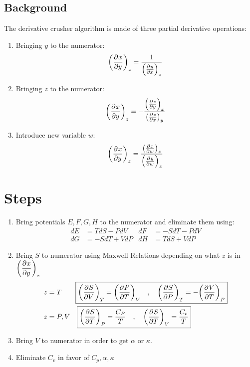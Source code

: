 \documentclass{article}
\begin{document}
    \subsection{Background}
    The derivative crusher algorithm is made of three partial derivative operations:
    \begin{enumerate}
        \item Bringing $y$ to the numerator:
        \begin{equation*}
            \pder{x}{y}[z]=\oo{\pder{y}{x}[z]}
        \end{equation*}
        \item Bringing $z$ to the numerator:
        \begin{equation*}
            \pder{x}{y}[z]=-\frac{\pder{z}{y}[x]}{\pder{z}{x}[y]}
        \end{equation*}
        \item Introduce new variable $w$:
        \begin{equation*}
            \pder{x}{y}[z]=\frac{\pder{x}{w}[z]}{\pder{y}{w}[z]}
        \end{equation*}
    \end{enumerate}
    \section{Steps}
    \begin{enumerate}
        \item Bring potentials $E,F,G,H$ to the numerator and eliminate them using:
        \begin{align*}
            dE&=TdS-PdV
            &
            dF&=-SdT-PdV
            \\
            dG&=-SdT+VdP
            &
            dH&=TdS+VdP
        \end{align*}
        \item Bring $S$ to numerator using Maxwell Relations depending on what $z$ is in $\displaystyle\pder{x}{y}[z]$
        \begin{align*}
            z&=T\qquad\boxed{\pder{S}{V}[T]=\pder{P}{T}[V]\quad,\quad \pder{S}{P}[T]=-\pder{V}{T}[P]}
            \\
            z&=P,V\quad\boxed{\pder{S}{T}[P]=\frac{C_P}{T}\quad,\quad \pder{S}{T}[V]=\frac{C_v}{T}}
        \end{align*}
        \item Bring $V$ to numerator in order to get $\alpha$ or $\kappa$. 
        \item Eliminate $C_v$ in favor of $C_p,\alpha,\kappa$
    \end{enumerate} 
\end{document}
